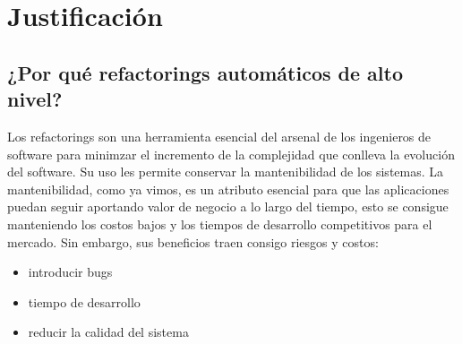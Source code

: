 \section{Justificación}

\subsection{¿Por qué refactorings automáticos de alto nivel?}
Los refactorings son una herramienta esencial del arsenal de los ingenieros de software para
minimzar el incremento de la complejidad que conlleva la evolución del software. Su uso les permite
conservar la mantenibilidad de los sistemas. La mantenibilidad, como ya vimos, es un atributo
esencial para que las aplicaciones puedan seguir aportando valor de negocio a lo largo del tiempo,
esto se consigue manteniendo los costos bajos y los tiempos de desarrollo competitivos para el
mercado.
Sin embargo, sus beneficios traen consigo riesgos y costos:

\begin{itemize}
    \item introducir bugs
    \item tiempo de desarrollo
    \item reducir la calidad del sistema
\end{itemize}

